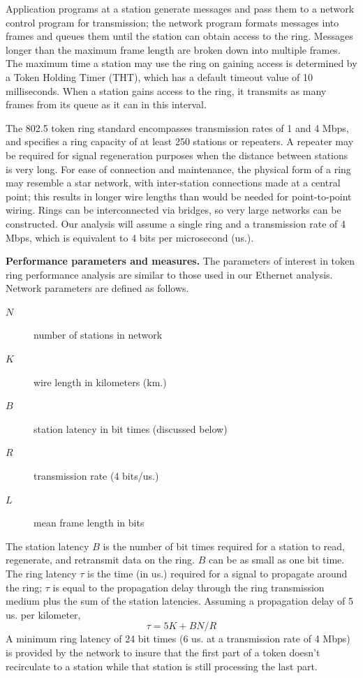 Application programs at a station generate messages and pass them to a network control program for transmission; the network program formats messages into frames and queues them until the station can obtain access to the ring. Messages longer than the maximum frame length are broken down into multiple frames. The maximum time a station may use the ring on gaining access is determined by a Token Holding Timer (THT), which has a default timeout value of 10 milliseconds. When a station gains access to the ring, it transmits as many frames from its queue as it can in this interval.

The 802.5 token ring standard encompasses transmission rates of 1 and 4 Mbps, and specifies a ring capacity of at least 250 stations or repeaters. A repeater may be required for signal regeneration purposes when the distance between stations is very long. For ease of connection and maintenance, the physical form of a ring may resemble a star network, with inter-station connections made at a central point; this results in longer wire lengths than would be needed for point-to-point wiring. Rings can be interconnected via bridges, so very large networks can be constructed. Our analysis will assume a single ring and a transmission rate of 4 Mbps, which is equivalent to 4 bits per microsecond (us.).

\noindent\textbf{Performance parameters and measures.} The parameters of interest in token ring performance analysis are similar to those used in our Ethernet analysis. Network parameters are defined as follows.
\begin{description}
\item[$N$] number of stations in network
\item[$K$] wire length in kilometers (km.)
\item[$B$] station latency in bit times (discussed below)
\item[$R$] transmission rate (4 bits/us.)
\item[$L$] mean frame length in bits
\end{description}



The station latency $B$ is the number of bit times required for a station to read, regenerate, and retransmit data on the ring. $B$ can be as small as one bit time. The ring latency $\tau$ is the time (in us.) required for a signal to propagate around the ring; $\tau$ is equal to the propagation delay through the ring transmission medium plus the sum of the station latencies. Assuming a propagation delay of 5 us. per kilometer,
\begin{equation} \tau=5K+BN/R \end{equation}
A minimum ring latency of 24 bit times (6 us. at a transmission rate of 4 Mbps) is provided by the network to insure that the first part of a token doesn't recirculate to a station while that station is still processing the last part.

